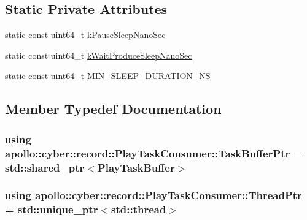 \subsection*{Static Private Attributes}
\begin{DoxyCompactItemize}
\item 
static const uint64\-\_\-t \hyperlink{classapollo_1_1cyber_1_1record_1_1PlayTaskConsumer_a980451c4e32dd8aa852aa6d76546ce90}{k\-Pause\-Sleep\-Nano\-Sec}
\item 
static const uint64\-\_\-t \hyperlink{classapollo_1_1cyber_1_1record_1_1PlayTaskConsumer_a6ad2f06bbf25d01836e10dade833b51d}{k\-Wait\-Produce\-Sleep\-Nano\-Sec}
\item 
static const uint64\-\_\-t \hyperlink{classapollo_1_1cyber_1_1record_1_1PlayTaskConsumer_a7b5af77e31d88ece6ff17c518301e702}{M\-I\-N\-\_\-\-S\-L\-E\-E\-P\-\_\-\-D\-U\-R\-A\-T\-I\-O\-N\-\_\-\-N\-S}
\end{DoxyCompactItemize}


\subsection{Member Typedef Documentation}
\hypertarget{classapollo_1_1cyber_1_1record_1_1PlayTaskConsumer_aaec143d18559ee0406ab272d8cbaab2e}{
\subsubsection[{Task\-Buffer\-Ptr}]{\setlength{\rightskip}{0pt plus 5cm}using {\bf apollo\-::cyber\-::record\-::\-Play\-Task\-Consumer\-::\-Task\-Buffer\-Ptr} =  std\-::shared\-\_\-ptr$<${\bf Play\-Task\-Buffer}$>$}}\label{classapollo_1_1cyber_1_1record_1_1PlayTaskConsumer_aaec143d18559ee0406ab272d8cbaab2e}
\hypertarget{classapollo_1_1cyber_1_1record_1_1PlayTaskConsumer_afb48697be572010d788d1fa66e4aaa1f}{
\subsubsection[{Thread\-Ptr}]{\setlength{\rightskip}{0pt plus 5cm}using {\bf apollo\-::cyber\-::record\-::\-Play\-Task\-Consumer\-::\-Thread\-Ptr} =  std\-::unique\-\_\-ptr$<$std\-::thread$>$}}\label{classapollo_1_1cyber_1_1record_1_1PlayTaskConsumer_afb48697be572010d788d1fa66e4aaa1f}


